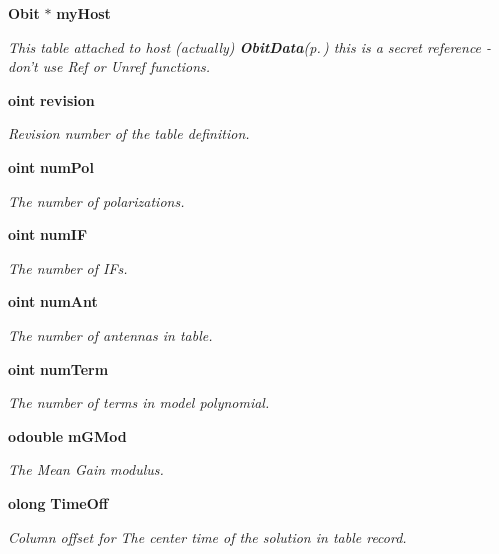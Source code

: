 \begin{CompactItemize}
{\bf Obit} $\ast$ {\bf my\-Host}
\begin{CompactList}\small\item\em This table attached to host (actually) {\bf Obit\-Data}{\rm (p.\,\pageref{structObitData})} this is a secret reference - don't use Ref or Unref functions. \item\end{CompactList}\item 
{\bf oint} {\bf revision}
\begin{CompactList}\small\item\em Revision number of the table definition. \item\end{CompactList}\item 
{\bf oint} {\bf num\-Pol}
\begin{CompactList}\small\item\em The number of polarizations. \item\end{CompactList}\item 
{\bf oint} {\bf num\-IF}
\begin{CompactList}\small\item\em The number of IFs. \item\end{CompactList}\item 
{\bf oint} {\bf num\-Ant}
\begin{CompactList}\small\item\em The number of antennas in table. \item\end{CompactList}\item 
{\bf oint} {\bf num\-Term}
\begin{CompactList}\small\item\em The number of terms in model polynomial. \item\end{CompactList}\item 
{\bf odouble} {\bf m\-GMod}
\begin{CompactList}\small\item\em The Mean Gain modulus. \item\end{CompactList}\item 
{\bf olong} {\bf Time\-Off}
\begin{CompactList}\small\item\em Column offset for The center time of the solution in table record. \item\end{CompactList}\item 

\end{CompactItemize}
